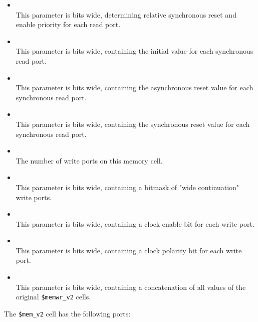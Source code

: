 \begin{itemize}
\item {} \\
This parameter is  bits wide, determining relative synchronous reset and enable priority for each read port.

\item {} \\
This parameter is  bits wide, containing the initial value for each synchronous read port.

\item {} \\
This parameter is  bits wide, containing the asynchronous reset value for each synchronous read port.

\item {} \\
This parameter is  bits wide, containing the synchronous reset value for each synchronous read port.

\item {} \\
The number of write ports on this memory cell.

\item {} \\
This parameter is  bits wide, containing a bitmask of "wide continuation" write ports.

\item {} \\
This parameter is  bits wide, containing a clock enable bit for each write port.

\item {} \\
This parameter is  bits wide, containing a clock polarity bit for each write port.

\item {} \\
This parameter is  bits wide, containing a concatenation of all
 values of the original {\tt \$memwr\_v2} cells.
\end{itemize}

The {\tt \$mem\_v2} cell has the following ports:


